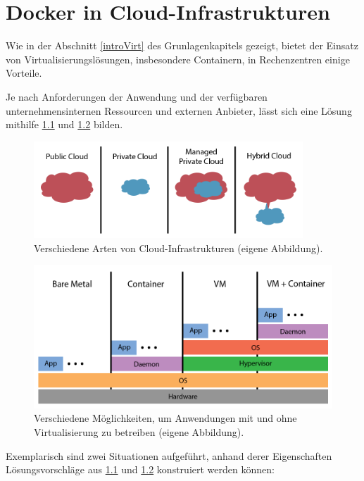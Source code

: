 \documentclass[../main.tex]{subfiles}
\begin{document}
\chapter{Docker in Cloud-Infrastrukturen}
\label{secInfrastructure}
  Wie in der Abschnitt \ref{introVirt} des Grunlagenkapitels gezeigt, bietet der Einsatz von Virtualisierungslösungen, insbesondere Containern, in Rechenzentren einige Vorteile.

  Je nach Anforderungen der Anwendung und der verfügbaren unternehmensinternen Ressourcen und externen Anbieter, lässt sich eine Lösung mithilfe \fig \ref{fig:infrastructure_cloud} und \fig \ref{fig:infrastructure_deployment} bilden.

  \begin{figure}[!h]
      \centering
      \includegraphics[width=0.9\textwidth]{./images/infrastructure_cloud.png}
      \caption{Verschiedene Arten von Cloud-Infrastrukturen (eigene Abbildung).}
      \label{fig:infrastructure_cloud}
  \end{figure}
  \clearpage
  \begin{figure}[!h]
      \centering
      \includegraphics[width=1\textwidth]{./images/infrastructure_deployment.png}
      \caption{Verschiedene Möglichkeiten, um Anwendungen mit und ohne Virtualisierung zu betreiben (eigene Abbildung).}
      \label{fig:infrastructure_deployment}
  \end{figure}

  Exemplarisch sind zwei Situationen aufgeführt, anhand derer Eigenschaften Lösungsvorschläge aus \fig \ref{fig:infrastructure_cloud} und \ref{fig:infrastructure_deployment} konstruiert werden können:
\end{document}
